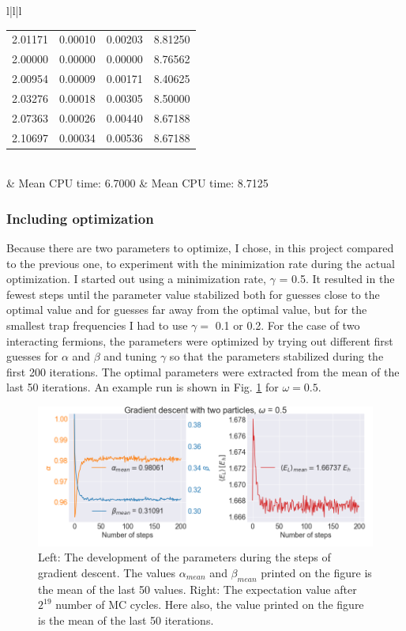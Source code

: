 \begin{table}[H]
\begin{tabular}{l|l|l}
\begin{tabular}{cccc}
2.01171 & 0.00010 & 0.00203 & 8.81250\\
2.00000 & 0.00000 & 0.00000 & 8.76562\\
2.00954 & 0.00009 & 0.00171 & 8.40625\\
2.03276 & 0.00018 & 0.00305 & 8.50000\\
2.07363 & 0.00026 & 0.00440 & 8.67188\\
2.10697 & 0.00034 & 0.00536 & 8.67188\\ \hline
\end{tabular}\\
& Mean CPU time:  6.7000 & Mean CPU time:  8.7125\\
\end{tabular}
\end{table}

\subsubsection{Including optimization}

Because there are two parameters to optimize, I chose, in this project compared to the previous one, to experiment with the minimization rate during the actual optimization. I started out using a minimization rate, $\gamma$ = 0.5. It resulted in the fewest steps until the parameter value stabilized both for guesses close to the optimal value and for guesses far away from the optimal value, but for the smallest trap frequencies I had to use $\gamma = $ 0.1 or 0.2. For the case of two interacting fermions, the parameters were optimized by trying out different first guesses for $\alpha$ and $\beta$ and tuning $\gamma$ so that the parameters stabilized during the first 200 iterations. The optimal parameters were extracted from the mean of the last 50 iterations. An example run is shown in Fig. \ref{fig:example_gradient_descent} for $\omega = 0.5$.

\begin{figure}[H]
\center
\includegraphics[width=0.8\linewidth]{../Results/example_gradient_descent}\caption{Left: The development of the parameters during the steps of gradient descent. The values $\alpha_{mean}$ and $\beta_{mean}$ printed on the figure is the mean of the last 50 values. Right: The expectation value after $2^{19}$ number of MC cycles. Here also, the value printed on the figure is the mean of the last 50 iterations. }\label{fig:example_gradient_descent}
\end{figure}

